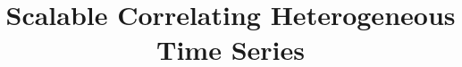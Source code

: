 \documentclass{sig-alternate}
\begin{document}
%

\title{Scalable Correlating Heterogeneous Time Series}
 

%
%
%
%
%
\end{document}
